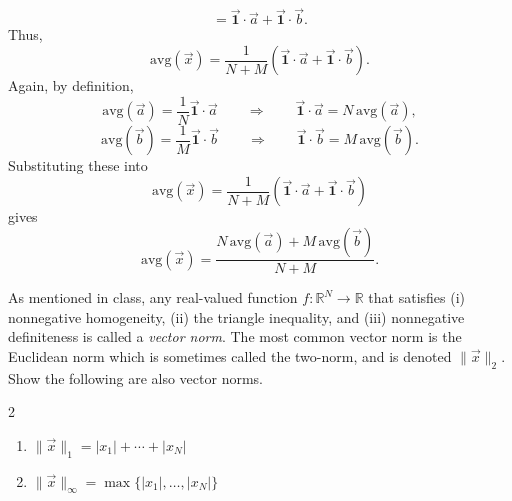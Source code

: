 \documentclass[10pt]{extarticle}
\begin{document}
\begin{enumerate}[label=(\alph*)]
\[=
\vec{\mathbf{1}}\cdot\vec{a}+\vec{\mathbf{1}}\cdot\vec{b}.
\]
Thus,
\[
\mathrm{avg}(\vec{x})=\frac{1}{N+M}\left(\vec{\mathbf{1}}\cdot\vec{a}+\vec{\mathbf{1}}\cdot\vec{b}\right).
\]
Again, by definition,
\[
\mathrm{avg}(\vec{a})=\frac{1}{N}\vec{\mathbf{1}}\cdot\vec{a}
\qquad\Rightarrow\qquad
\vec{\mathbf{1}}\cdot\vec{a}=N\,\mathrm{avg}(\vec{a}),
\]
\[
\mathrm{avg}(\vec{b})=\frac{1}{M}\vec{\mathbf{1}}\cdot\vec{b}
\qquad\Rightarrow\qquad
\vec{\mathbf{1}}\cdot\vec{b}=M\,\mathrm{avg}(\vec{b}).
\]
Substituting these into
\[
\mathrm{avg}(\vec{x})=\frac{1}{N+M}\left(\vec{\mathbf{1}}\cdot\vec{a}+\vec{\mathbf{1}}\cdot\vec{b}\right)
\]
gives
\[
\mathrm{avg}(\vec{x})=\frac{N\,\mathrm{avg}(\vec{a})+M\,\mathrm{avg}(\vec{b})}{N+M}.
\]
\end{enumerate}

\begin{problem}
[Problem 4]
As mentioned in class, any real-valued function $f:\mathbb{R}^N\to\mathbb{R}$ that satisfies (i) nonnegative homogeneity, (ii) the triangle inequality, and (iii) nonnegative definiteness is called a \emph{vector norm}. The most common vector norm is the Euclidean norm which is sometimes called the two-norm, and is denoted $\|\vec{x}\|_2$. Show the following are also vector norms.
\begin{multicols}{2}
\begin{enumerate}[label=(\alph*)]
\item $\|\vec{x}\|_1=|x_1|+\cdots+|x_N|$
\item $\|\vec{x}\|_\infty=\max\{|x_1|,\dots,|x_N|\}$
\end{enumerate}
\end{multicols}
\end{problem}
\end{document}
